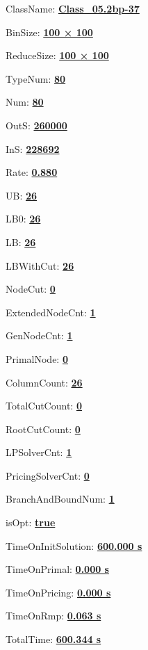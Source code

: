 \documentclass[11pt]{article}
\begin{document}
\pagestyle{empty}


ClassName: \underline{\textbf{Class_05.2bp-37}}
\par
BinSize: \underline{\textbf{100 × 100}}
\par
ReduceSize: \underline{\textbf{100 × 100}}
\par
TypeNum: \underline{\textbf{80}}
\par
Num: \underline{\textbf{80}}
\par
OutS: \underline{\textbf{260000}}
\par
InS: \underline{\textbf{228692}}
\par
Rate: \underline{\textbf{0.880}}
\par
UB: \underline{\textbf{26}}
\par
LB0: \underline{\textbf{26}}
\par
LB: \underline{\textbf{26}}
\par
LBWithCut: \underline{\textbf{26}}
\par
NodeCut: \underline{\textbf{0}}
\par
ExtendedNodeCnt: \underline{\textbf{1}}
\par
GenNodeCnt: \underline{\textbf{1}}
\par
PrimalNode: \underline{\textbf{0}}
\par
ColumnCount: \underline{\textbf{26}}
\par
TotalCutCount: \underline{\textbf{0}}
\par
RootCutCount: \underline{\textbf{0}}
\par
LPSolverCnt: \underline{\textbf{1}}
\par
PricingSolverCnt: \underline{\textbf{0}}
\par
BranchAndBoundNum: \underline{\textbf{1}}
\par
isOpt: \underline{\textbf{true}}
\par
TimeOnInitSolution: \underline{\textbf{600.000 s}}
\par
TimeOnPrimal: \underline{\textbf{0.000 s}}
\par
TimeOnPricing: \underline{\textbf{0.000 s}}
\par
TimeOnRmp: \underline{\textbf{0.063 s}}
\par
TotalTime: \underline{\textbf{600.344 s}}
\par
\newpage


\end{document}
